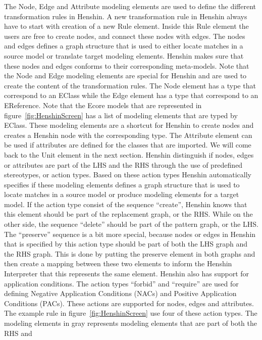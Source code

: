 The Node, Edge and Attribute modeling elements are used to define the different
transformation rules in Henshin. A new transformation rule in Henshin always
have to start with creation of a new Rule element. Inside this Rule element the
users are free to create nodes, and connect these nodes with edges. The nodes
and edges defines a graph structure that is used to either locate matches in a
source model or translate target modeling elements. Henshin makes sure that
these nodes and edges conforms to their corresponding meta-models. Note that the
Node and Edge modeling elements are special for Henshin and are used to create
the content of the transformation rules. The Node element has a type that
correspond to an EClass while the Edge element has a type that correspond to an
EReference. Note that the Ecore models that are represented in
figure~\ref{fig:HenshinScreen} has a list of modeling elements that are typed by
EClass. These modeling elements are a shortcut for Henshin to create nodes and
creates a Henshin node with the corresponding type. The Attribute element can be
used if attributes are defined for the classes that are imported. We will come
back to the Unit element in the next section. Henshin distinguish if nodes,
edges or attributes are part of the LHS and the RHS through the use of
predefined stereotypes, or action types. Based on these action types Henshin
automatically specifies if these modeling elements defines a graph structure
that is used to locate matches in a source model or produce modeling elements
for a target model. If the action type consist of the sequence ``create'',
Henshin knows that this element should be part of the replacement graph, or the
RHS. While on the other side, the sequence ``delete'' should be part of the
pattern graph, or the LHS. The ``preserve'' sequence is a bit more special,
because nodes or edges in Henshin that is specified by this action type should
be part of both the LHS graph and the RHS graph. This is done by putting the
preserve element in both graphs and then create a mapping between these two
elements to inform the Henshin Interpreter that this represents the same
element. Henshin also has support for application conditions. The action types
``forbid'' and ``require'' are used for defining Negative Application
Conditions (NACs) and Positive Application Conditions (PACs). These actions are
supported for nodes, edges and attributes. The example rule in
figure~\ref{fig:HenshinScreen} use four of these action types. The modeling
elements in gray represents modeling elements that are part of both the RHS and
